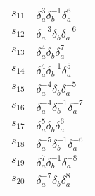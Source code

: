 \documentclass{article}
\begin{document}
\begin{center}
\begin{tabular}{ll}
$s_{11}$ & $\delta_a^{3}\delta_b^{-1}\delta_a^{6}$ \\
$s_{12}$ & $\delta_a^{-3}\delta_b^{}\delta_a^{-6}$ \\
$s_{13}$ & $\delta_a^{4}\delta_b^{}\delta_a^{7}$ \\
$s_{14}$ & $\delta_a^{4}\delta_b^{-1}\delta_a^{5}$ \\
$s_{15}$ & $\delta_a^{-4}\delta_b^{}\delta_a^{-5}$ \\
$s_{16}$ & $\delta_a^{-4}\delta_b^{-1}\delta_a^{-7}$ \\
$s_{17}$ & $\delta_a^{5}\delta_b^{}\delta_a^{6}$ \\
$s_{18}$ & $\delta_a^{-5}\delta_b^{-1}\delta_a^{-6}$ \\
$s_{19}$ & $\delta_a^{7}\delta_b^{-1}\delta_a^{-8}$ \\
$s_{20}$ & $\delta_a^{-7}\delta_b^{}\delta_a^{8}$ \\
\bottomrule
\end{tabular}
\end{center}

\thispagestyle{empty}
\end{document}
